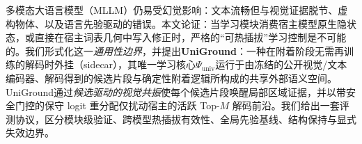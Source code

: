 多模态大语言模型（MLLM）仍易受幻觉影响：文本流畅但与视觉证据脱节、虚构物体、以及语言先验驱动的错误。本文论证：当学习模块消费宿主模型原生隐状态，或直接在宿主词表几何中写入修正时，严格的“可热插拔”学习控制是不可能的。我们形式化这一\emph{通用性边界}，并提出\textbf{UniGround}：一种在附着阶段无需再训练的解码时外挂（sidecar），其唯一学习核心$\Psi_{\mathrm{univ}}$运行于由冻结的公开视觉/文本编码器、解码得到的候选片段与确定性附着逻辑所构成的共享外部语义空间。UniGround通过\emph{候选驱动的视觉共振}使每个候选片段唤醒局部区域证据，并以带安全门控的保守 logit 重分配仅扰动宿主的活跃 Top-$M$ 解码前沿。我们给出一套评测协议，区分模块级验证、跨模型热插拔有效性、全局先验基线、结构保持与显式失效边界。
